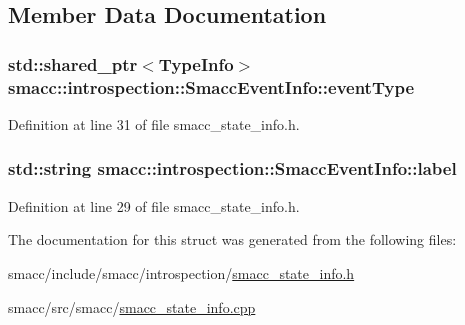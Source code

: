 \subsection{Member Data Documentation}
\subsubsection[{\texorpdfstring{event\+Type}{eventType}}]{\setlength{\rightskip}{0pt plus 5cm}std\+::shared\+\_\+ptr$<${\bf Type\+Info}$>$ smacc\+::introspection\+::\+Smacc\+Event\+Info\+::event\+Type}\hypertarget{structsmacc_1_1introspection_1_1SmaccEventInfo_af3bdf1abf797864e681662d92a5515f9}{}\label{structsmacc_1_1introspection_1_1SmaccEventInfo_af3bdf1abf797864e681662d92a5515f9}


Definition at line 31 of file smacc\+\_\+state\+\_\+info.\+h.

\subsubsection[{\texorpdfstring{label}{label}}]{\setlength{\rightskip}{0pt plus 5cm}std\+::string smacc\+::introspection\+::\+Smacc\+Event\+Info\+::label}\hypertarget{structsmacc_1_1introspection_1_1SmaccEventInfo_a2bbed6ad8013758e23761c92d70c2fd1}{}\label{structsmacc_1_1introspection_1_1SmaccEventInfo_a2bbed6ad8013758e23761c92d70c2fd1}


Definition at line 29 of file smacc\+\_\+state\+\_\+info.\+h.



The documentation for this struct was generated from the following files\+:\begin{DoxyCompactItemize}
\item 
smacc/include/smacc/introspection/\hyperlink{smacc__state__info_8h}{smacc\+\_\+state\+\_\+info.\+h}\item 
smacc/src/smacc/\hyperlink{smacc__state__info_8cpp}{smacc\+\_\+state\+\_\+info.\+cpp}\end{DoxyCompactItemize}
